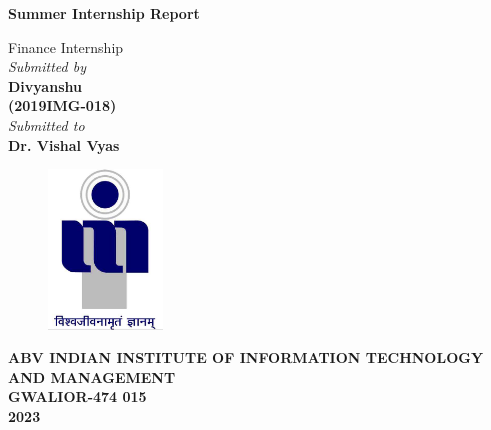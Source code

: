 \title{}
\author{}
\thispagestyle{empty}

\begin{titlepage}
\begin{center}
{\LARGE \bf Summer Internship Report} \\
\end{center}
\begin{center}
\vspace{0.6in}
{\LARGE Finance Internship} \\
\vspace{0.6in}
{\large \it Submitted by\\\vspace{0.1in}}
{\large \bf \vspace{0.2in}Divyanshu\\(2019IMG-018)\\}
\vspace{0.6in}
{\large \it Submitted to\\}
\vspace{0.1in}
{\large \bf Dr. Vishal Vyas}\\
\end {center}
\vspace{0.5in}
\begin{figure}[h]
\centerline{\includegraphics[width=1.2in]{./iiitm}}
\end{figure}
\begin{center}
{\Large \bf ABV INDIAN INSTITUTE OF INFORMATION TECHNOLOGY AND MANAGEMENT\\
GWALIOR-474 015\\}
\vspace{0.2in}
{\Large \bf 2023\\}
\end{center}
\end{titlepage}
